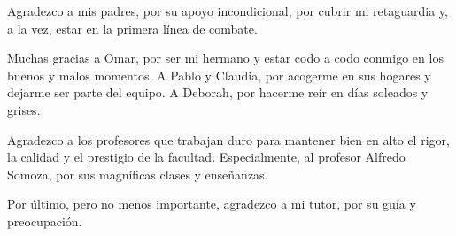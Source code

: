 \begin{acknowledgements}
    Agradezco a mis padres, por su apoyo incondicional, por cubrir mi retaguardia y, a la vez, estar en la primera l\'inea de combate.

    Muchas gracias a Omar, por ser mi hermano y estar codo a codo conmigo en los buenos y malos momentos. A Pablo y Claudia, por acogerme en sus hogares y dejarme ser parte del equipo. A Deborah, por hacerme re\'ir en d\'ias soleados y grises.

    Agradezco a los profesores que trabajan duro para mantener bien en alto el rigor, la calidad y el prestigio de la facultad. Especialmente, al profesor Alfredo Somoza, por sus magn\'ificas clases y ense\~nanzas.

    Por \'ultimo, pero no menos importante, agradezco a mi tutor, por su gu\'ia y preocupaci\'on.
\end{acknowledgements}